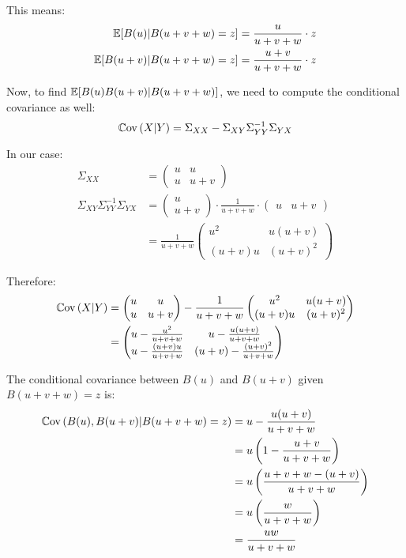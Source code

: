 \documentclass[12pt]{article}
\begin{document}
\begin{enumerate}
		This means:
		\begin{align*}
			\mathbb{E}[B(u)|B(u+v+w) = z] &= \frac{u}{u+v+w} \cdot z \\
			\mathbb{E}[B(u+v)|B(u+v+w) = z] &= \frac{u+v}{u+v+w} \cdot z
		\end{align*}
		
		Now, to find $\mathbb{E}[B(u)B(u+v)|B(u+v+w)]$, we need to compute the conditional covariance as well:
		\begin{equation*}
			\mathbb{C}\mathrm{ov}\,(X|Y) = \Sigma_{XX} - \Sigma_{XY}\Sigma_{YY}^{-1}\Sigma_{YX}
		\end{equation*}
		
		In our case:
		\begin{align*}
			\Sigma_{XX} &= \begin{pmatrix} u & u \\ u & u+v \end{pmatrix} \\
			\Sigma_{XY}\Sigma_{YY}^{-1}\Sigma_{YX} &= \begin{pmatrix} u \\ u+v \end{pmatrix} \cdot \frac{1}{u+v+w} \cdot \begin{pmatrix} u & u+v \end{pmatrix} \\
			&= \frac{1}{u+v+w} \begin{pmatrix} u^2 & u(u+v) \\ (u+v)u & (u+v)^2 \end{pmatrix}
		\end{align*}
		
		Therefore:
		\begin{align*}
			\mathbb{C}\mathrm{ov}\,(X|Y) &= \begin{pmatrix} u & u \\ u & u+v \end{pmatrix} - \frac{1}{u+v+w} \begin{pmatrix} u^2 & u(u+v) \\ (u+v)u & (u+v)^2 \end{pmatrix} \\
			&= \begin{pmatrix} u - \frac{u^2}{u+v+w} & u - \frac{u(u+v)}{u+v+w} \\ u - \frac{(u+v)u}{u+v+w} & (u+v) - \frac{(u+v)^2}{u+v+w} \end{pmatrix}
		\end{align*}
		
		The conditional covariance between $B(u)$ and $B(u+v)$ given $B(u+v+w) = z$ is:
		\begin{align*}
			\mathbb{C}\mathrm{ov}\,(B(u), B(u+v)|B(u+v+w) = z) &= u - \frac{u(u+v)}{u+v+w} \\
			&= u\left(1 - \frac{u+v}{u+v+w}\right) \\
			&= u\left(\frac{u+v+w-(u+v)}{u+v+w}\right) \\
			&= u\left(\frac{w}{u+v+w}\right) \\
			&= \frac{uw}{u+v+w}
		\end{align*}
		

\end{enumerate}
\end{document}
